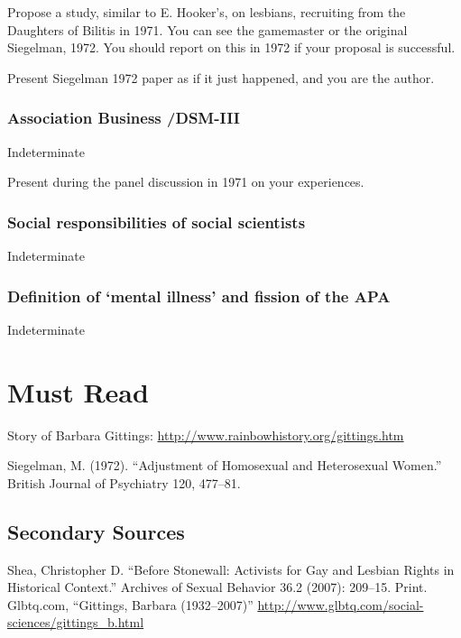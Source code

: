\begin{refsection}
Propose a study, similar to E. Hooker’s, on lesbians, recruiting from the Daughters of Bilitis in 1971. You can see the gamemaster or the original Siegelman, 1972. You should report on this in 1972 if your proposal is successful.
\begin{writingtask}[Gittings]\label{writingtask2:gittings}
Present Siegelman 1972 paper as if it just happened, and you are the author.
\end{writingtask}

\subsubsection{Association Business \slash  DSM-III}
\label{associationbusinessdsm-iii}

Indeterminate\begin{writingtask}[Gittings]\label{writingtask:gittings}
Present during the panel discussion in 1971 on your experiences.
\end{writingtask}

\subsubsection{Social responsibilities of social scientists}
\label{socialresponsibilitiesofsocialscientists}

Indeterminate

\subsubsection{Definition of ‘mental illness’ and fission of the APA}
\label{definitionof‘mentalillness’andfissionoftheapa}

Indeterminate

\section{Must Read}
\label{mustread}

Story of Barbara Gittings: \url{http://www.rainbowhistory.org/gittings.htm}

Siegelman, M. (1972). “Adjustment of Homosexual and Heterosexual Women.” British Journal of Psychiatry 120, 477--81.

\subsection{Secondary Sources}
\label{secondarysources}

Shea, Christopher D. ``Before Stonewall: Activists for Gay and Lesbian Rights in Historical Context.'' Archives of Sexual Behavior 36.2 (2007): 209--15. Print.
Glbtq.com, “Gittings, Barbara (1932--2007)” \url{http://www.glbtq.com/social-sciences/gittings_b.html}


\end{refsection}
